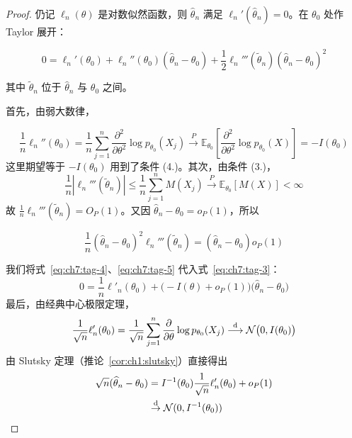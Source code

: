 \begin{proof}

仍记 $\ell_n(\theta)$ 是对数似然函数，则 $\widehat{\theta}_n$ 满足 $\ell_n'(\widehat{\theta}_n) = 0$。在 $\theta_0$ 处作 Taylor 展开：

\begin{equation}
\label{eq:ch7:tag-3}
0 = \ell_n'(\theta_0) + \ell_n''(\theta_0)(\widehat{\theta}_n - \theta_0) + \frac{1}{2} \ell_n'''(\widetilde{\theta}_n) (\widehat{\theta}_n - \theta_0)^2
\end{equation}

其中 $\widetilde{\theta}_n$ 位于 $\widehat{\theta}_n$ 与 $\theta_0$ 之间。

首先，由弱大数律，

\begin{equation}
\label{eq:ch7:tag-4}
\frac1n\ell_n''(\theta_0) = \frac{1}{n} \sum_{j=1}^n \frac{\partial^2}{\partial \theta^2} \log p_{\theta_0}(X_j) \overset{P}{\longrightarrow} \mathbb{E}_{\theta_0}\left[ \frac{\partial^2}{\partial \theta^2} \log p_{\theta_0}(X) \right] = -I(\theta_0)
\end{equation}
这里期望等于 $-I(\theta_0)$ 用到了条件 (4.)。其次，由条件 (3.)，
\[\frac1n|\ell_n'''(\widetilde{\theta}_n)| \le \frac{1}{n} \sum_{j=1}^n M(X_j) \overset{P}{\longrightarrow} \mathbb{E}_{\theta_0}[M(X)] < \infty\]
故 $\tfrac1n\ell_n'''(\widetilde{\theta}_n) = O_P(1)$。又因 $\widehat{\theta}_n - \theta_0 = o_P(1)$，所以

\begin{equation}
\label{eq:ch7:tag-5}
\frac1n(\widehat{\theta}_n - \theta_0)^2 \ell_n'''(\widetilde{\theta}_n) = (\widehat{\theta}_n - \theta_0)o_P(1)
\end{equation}

我们将式~\eqref{eq:ch7:tag-4}、\eqref{eq:ch7:tag-5} 代入式~\eqref{eq:ch7:tag-3}：\[
0=\frac1n\ell'_n(\theta_0)+\big(-I(\theta)+o_P(1)\big)\big(\widehat\theta_n-\theta_0\big)\]
最后，由经典中心极限定理，\[
\frac1{\sqrt n}\ell_n'(\theta_0) = \frac{1}{\sqrt{n}} \sum_{j=1}^n \frac{\partial}{\partial\theta} \log p_{\theta_0}(X_j) \overset{\rm d}\longrightarrow \mathcal{N}\big(0, I(\theta_0)\big)\]
由 Slutsky 定理（推论~\ref{cor:ch1:slutsky}）直接得出\[ \begin{aligned} \sqrt{n}(\widehat{\theta}_n-\theta_0) & =I^{-1}(\theta_{0})\frac1{\sqrt{n}}\ell_{n}^{\prime}(\theta_{0})+o_{P}(1)\\ &\overset{\rm d}\to\mathcal N(0,I^{-1}(\theta_{0})) \end{aligned} \]

\end{proof}

